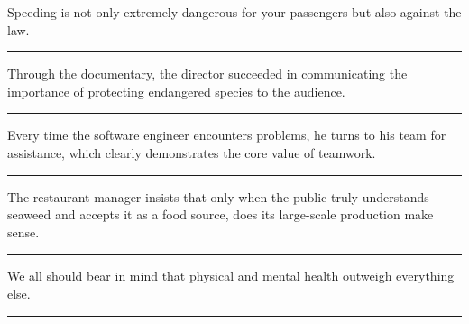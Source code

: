 \documentclass[11pt,a4paper]{article}
\newcommand{\num}[1]{\makebox[1.9em][r]{#1.}\hspace{0.3em}}
\newcommand{\wline}{\noindent\rule{\linewidth}{0.4pt}}
\begin{document}
\vspace{0.35em}\vspace{0.15em}

\begin{minipage}{\linewidth}

\num{19}Speeding is not only extremely dangerous for your passengers but also against the law.

\vspace{0.25em}

\wline

\end{minipage}

\begin{minipage}{\linewidth}

\num{20}Through the documentary, the director succeeded in communicating the importance of protecting endangered species to the audience.

\vspace{0.25em}

\wline

\end{minipage}

\begin{minipage}{\linewidth}

\num{21}Every time the software engineer encounters problems, he turns to his team for assistance, which clearly demonstrates the core value of teamwork.

\vspace{0.25em}

\wline

\end{minipage}

\begin{minipage}{\linewidth}

\num{22}The restaurant manager insists that only when the public truly understands seaweed and accepts it as a food source, does its large-scale production make sense.

\vspace{0.25em}

\wline

\end{minipage}

\vspace{0.35em}\vspace{0.15em}

\begin{minipage}{\linewidth}

\num{23}We all should bear in mind that physical and mental health outweigh everything else.

\vspace{0.25em}

\wline

\end{minipage}
\end{document}

